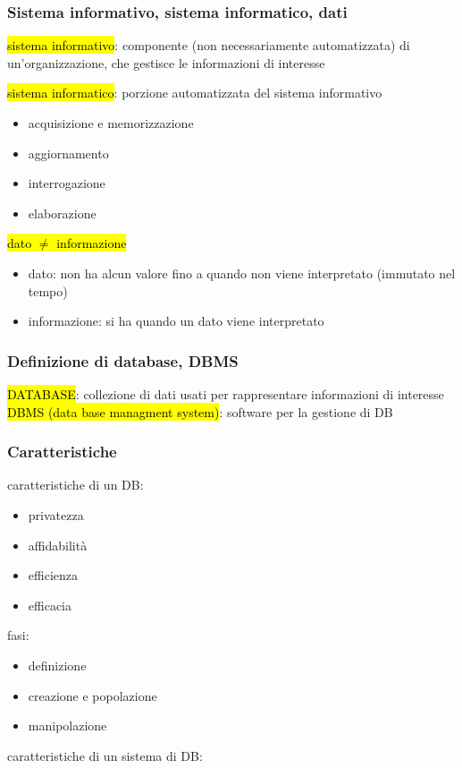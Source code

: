 \documentclass[a4paper]{article}
\begin{document}
\subsubsection{Sistema informativo, sistema informatico, dati}\par \hl{sistema informativo}: componente (non necessariamente automatizzata) di un’organizzazione, che gestisce le informazioni di interesse\medskip\\\par \hl{sistema informatico}: porzione automatizzata del sistema informativo
\begin{itemize}[noitemsep]
  \item acquisizione e memorizzazione
  \item aggiornamento
  \item interrogazione
  \item elaborazione
\end{itemize}\par \hl{dato $\neq$ informazione}
\begin{itemize}[noitemsep]
  \item dato: non ha alcun valore fino a quando non viene interpretato (immutato nel tempo)
  \item informazione: si ha quando un dato viene interpretato
\end{itemize}\par \subsubsection{Definizione di database, DBMS}
\hl{DATABASE}: collezione di dati usati per rappresentare informazioni di interesse\\
\hl{DBMS (data base managment system)}: software per la gestione di DB\par \subsubsection{Caratteristiche}
caratteristiche di un DB:
\begin{itemize}[noitemsep]
  \item privatezza
  \item affidabilità
  \item efficienza
  \item efficacia
\end{itemize}\par fasi:
\begin{itemize}[noitemsep]
  \item definizione
  \item creazione e popolazione
  \item manipolazione
\end{itemize}\par caratteristiche di un sistema di DB:
\end{document}
